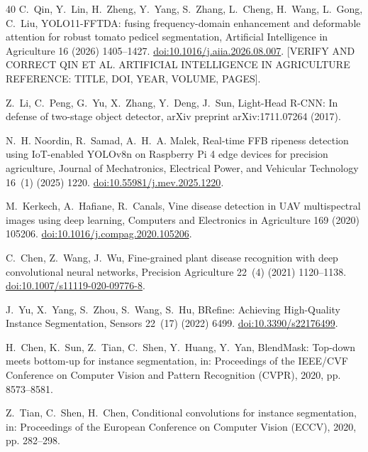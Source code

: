 \documentclass[5p,times]{elsarticle}
\begin{document}
\begin{thebibliography}{40}
C.~Qin, Y.~Lin, H.~Zheng, Y.~Yang, S.~Zhang, L.~Cheng, H.~Wang, L.~Gong, C.~Liu,
  YOLO11-FFTDA: fusing frequency-domain enhancement and deformable attention for robust tomato pedicel segmentation,
  Artificial Intelligence in Agriculture 16 (2026) 1405--1427. \href{https://doi.org/10.1016/j.aiia.2026.08.007}{doi:10.1016/j.aiia.2026.08.007}.
  [VERIFY AND CORRECT QIN ET AL. ARTIFICIAL INTELLIGENCE IN AGRICULTURE REFERENCE: TITLE, DOI, YEAR, VOLUME, PAGES].

Z.~Li, C.~Peng, G.~Yu, X.~Zhang, Y.~Deng, J.~Sun, Light-Head R-CNN: In defense
  of two-stage object detector, arXiv preprint arXiv:1711.07264 (2017).

N.~H. Noordin, R.~Samad, A.~H.~A. Malek, Real-time FFB ripeness detection using
  IoT-enabled YOLOv8n on Raspberry Pi 4 edge devices for precision agriculture,
  Journal of Mechatronics, Electrical Power, and Vehicular Technology 16~(1)
  (2025) 1220. \href{https://doi.org/10.55981/j.mev.2025.1220}{doi:10.55981/j.mev.2025.1220}.

M.~Kerkech, A.~Hafiane, R.~Canals, Vine disease detection in UAV multispectral
  images using deep learning, Computers and Electronics in Agriculture 169
  (2020) 105206. \href{https://doi.org/10.1016/j.compag.2020.105206}{doi:10.1016/j.compag.2020.105206}.

C.~Chen, Z.~Wang, J.~Wu, Fine-grained plant disease recognition with deep
  convolutional neural networks, Precision Agriculture 22~(4) (2021)
  1120--1138. \href{https://doi.org/10.1007/s11119-020-09776-8}{doi:10.1007/s11119-020-09776-8}.

J.~Yu, X.~Yang, S.~Zhou, S.~Wang, S.~Hu, BRefine: Achieving High-Quality
  Instance Segmentation, Sensors 22~(17) (2022) 6499. \href{https://doi.org/10.3390/s22176499}{doi:10.3390/s22176499}.

H.~Chen, K.~Sun, Z.~Tian, C.~Shen, Y.~Huang, Y.~Yan, BlendMask: Top-down meets
  bottom-up for instance segmentation, in: Proceedings of the IEEE/CVF
  Conference on Computer Vision and Pattern Recognition (CVPR), 2020, pp.
  8573--8581.

Z.~Tian, C.~Shen, H.~Chen, Conditional convolutions for instance segmentation,
  in: Proceedings of the European Conference on Computer Vision (ECCV), 2020,
  pp. 282--298.

\end{thebibliography}
\end{document}
